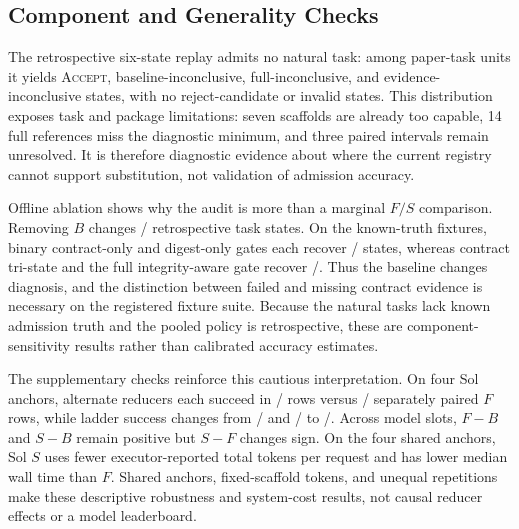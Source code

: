 \subsection{Component and Generality Checks}

The retrospective six-state replay admits no natural task: among \PrimaryTasks{} paper-task units it yields \SolStrictAccept{} \textsc{Accept}, \SolBaselineInconclusive{} baseline-inconclusive, \SolFullInconclusive{} full-inconclusive, and \SolEvidenceInconclusive{} evidence-inconclusive states, with no reject-candidate or invalid states. This distribution exposes task and package limitations: seven scaffolds are already too capable, 14 full references miss the diagnostic minimum, and three paired intervals remain unresolved. It is therefore diagnostic evidence about where the current registry cannot support substitution, not validation of admission accuracy.

Offline ablation shows why the audit is more than a marginal $F/S$ comparison. Removing $B$ changes \AblationBChangedTasks{}/\PrimaryTasks{} retrospective task states. On the known-truth fixtures, binary contract-only and digest-only gates each recover \AblationBinaryContractCorrect{}/\AblationTotalFixtures{} states, whereas contract tri-state and the full integrity-aware gate recover \AblationTriStateCorrect{}/\AblationTotalFixtures{}. Thus the baseline changes diagnosis, and the distinction between failed and missing contract evidence is necessary on the registered fixture suite. Because the natural tasks lack known admission truth and the pooled policy is retrospective, these are component-sensitivity results rather than calibrated accuracy estimates.

The supplementary checks reinforce this cautious interpretation. On four Sol anchors, alternate reducers each succeed in \ReducerDAGSuccess{}/\ReducerCandidateRows{} rows versus \ReducerFSuccess{}/\ReducerFRows{} separately paired $F$ rows, while ladder success changes from \LadderLZeroSuccess{}/\LadderCandidateRows{} and \LadderLOneSuccess{}/\LadderCandidateRows{} to \LadderLTwoSuccess{}/\LadderCandidateRows{}. Across \RobustnessModelSlots{} model slots, $F-B$ and $S-B$ remain positive but $S-F$ changes sign. On the four shared anchors, Sol $S$ uses \SolSTokenReduction{} fewer executor-reported total tokens per request and has \SolSLatencyReduction{} lower median wall time than $F$. Shared anchors, fixed-scaffold tokens, and unequal repetitions make these descriptive robustness and system-cost results, not causal reducer effects or a model leaderboard.
